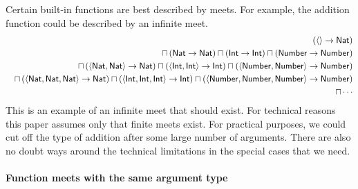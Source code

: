 \documentclass[12pt]{article}
\begin{document}
Certain built-in functions are best described by meets. For example, the
addition function could be described by an infinite meet. 
\begin{eqnarray*}
&&\left( \left\langle {}\right\rangle \rightarrow \mathsf{Nat}\right) \\
&&\sqcap \left( \mathsf{Nat}\rightarrow \mathsf{Nat}\right) \sqcap \left( 
\mathsf{Int}\rightarrow \mathsf{Int}\right) \sqcap \left( \mathsf{Number}%
\rightarrow \mathsf{Number}\right) \\
&&\sqcap \left( \left\langle \mathsf{Nat},\mathsf{Nat}\right\rangle
\rightarrow \mathsf{Nat}\right) \sqcap \left( \left\langle \mathsf{Int},%
\mathsf{Int}\right\rangle \rightarrow \mathsf{Int}\right) \sqcap \left(
\left\langle \mathsf{Number},\mathsf{Number}\right\rangle \rightarrow 
\mathsf{Number}\right) \\
&&\sqcap \left( \left\langle \mathsf{Nat},\mathsf{Nat},\mathsf{Nat}%
\right\rangle \rightarrow \mathsf{Nat}\right) \sqcap \left( \left\langle 
\mathsf{Int},\mathsf{Int},\mathsf{Int}\right\rangle \rightarrow \mathsf{Int}%
\right) \sqcap \left( \left\langle \mathsf{Number},\mathsf{Number},\mathsf{%
Number}\right\rangle \rightarrow \mathsf{Number}\right) \\
&&\sqcap \cdots
\end{eqnarray*}%
This is an example of an infinite meet that should exist. For technical
reasons this paper assumes only that finite meets exist. For practical
purposes, we could cut off the type of addition after some large number of
arguments. There are also no doubt ways around the technical limitations in
the special cases that we need.

\paragraph{Function meets with the same argument type}
\end{document}
